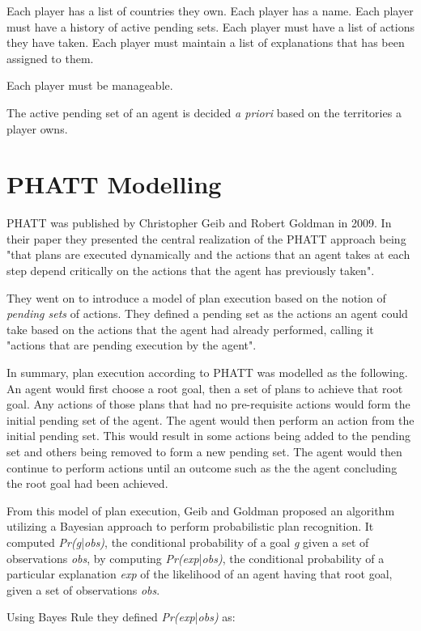 \documentclass[parskip]{cs4rep}
\begin{document}
Each player has a list of countries they own.
Each player has a name.
Each player must have a history of active pending sets.
Each player must have a list of actions they have taken.
Each player must maintain a list of explanations that has been assigned to them.

Each player must be manageable.

The active pending set of an agent is decided \textit{a priori} based on the territories a player owns.

\section{PHATT Modelling}

PHATT was published by Christopher Geib and Robert Goldman in 2009. In their paper they presented the central realization of the PHATT approach being "that plans are executed dynamically and the actions that an agent takes at each step depend critically on the actions that the agent has previously taken". 

They went on to introduce a model of plan execution based on the notion of \textit{pending sets} of actions. They defined a pending set as the actions an agent could take based on the actions that the agent had already performed, calling it "actions that are pending execution by the agent".

In summary, plan execution according to PHATT was modelled as the following. An agent would first choose a root goal, then a set of plans to achieve that root goal. Any actions of those plans that had no pre-requisite actions would form the initial pending set of the agent. The agent would then perform an action from the initial pending set. This would result in some actions being added to the pending set and others being removed to form a new pending set. The agent would then continue to perform actions until an outcome such as the the agent concluding the root goal had been achieved.

From this model of plan execution, Geib and Goldman proposed an algorithm utilizing a Bayesian approach to perform probabilistic plan recognition. It computed \textit{Pr(g}|\textit{obs)}, the conditional probability of a goal \textit{g} given a set of observations \textit{obs}, by computing \textit{Pr(exp}|\textit{obs)}, the conditional probability of a particular explanation \textit{exp} of the likelihood of an agent having that root goal, given a set of observations \textit{obs}.

Using Bayes Rule they defined \textit{Pr(exp}|\textit{obs)} as:\newline
\end{document}
